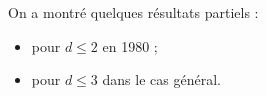 \documentclass[./main]{subfiles}
\begin{document}
  On a montré quelques résultats partiels :
  \begin{itemize}
    \item pour $d \le 2$ en 1980 ;
    \item pour $d \le 3$ dans le cas général.
  \end{itemize}

\end{document}
